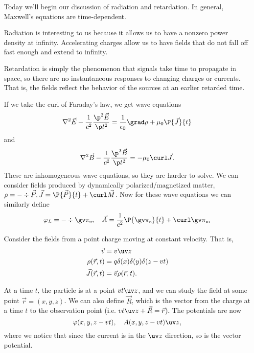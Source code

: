 Today we'll begin our discussion of radiation and retardation. In general, Maxwell's equations are time-dependent.

Radiation is interesting to us because it allows us to have a nonzero power density at infinity. Accelerating charges allow us to have fields that do not fall off fast enough and extend to infinity.

Retardation is simply the phenomenon that signals take time to propagate in space, so there are no instantaneous responses to changing charges or currents. That is, the fields reflect the behavior of the sources at an earlier retarded time.

If we take the curl of Faraday's law, we get wave equations
\begin{equation}
    \nabla^2 \vec E - \frac{1}{c^2} \frac{\p^2 \vec E}{\p t^2} = \frac{1}{\epsilon_0} \grad \rho + \mu_0 \P{\vec J}{t}
\end{equation}
and
\begin{equation}
    \nabla^2 \vec B -\frac{1}{c^2} \frac{\p^2 \vec B}{\p t^2} = -\mu_0 \curl \vec J.
\end{equation}
These are inhomogeneous wave equations, so they are harder to solve. We can consider fields produced by dynamically polarized/magnetized matter, $\rho = -\div \vec P, \vec J = \P{\vec P}{t} + \curl \vec M$. Now for these wave equations we can similarly define
\begin{equation}
    \varphi_L = -\div \gv \pi_\mathrm{e}, \quad \vec A = \frac{1}{c^2} \P{\gv \pi_e}{t} + \curl \gv \pi_\mathrm{m}
\end{equation}%

Consider the fields from a point charge moving at constant velocity. That is,
\begin{align}
    \vec v&= v\uv z\\
    \rho(\vec r,t) &= q \delta(x) \delta(y) \delta(z-vt)\\
    \vec J (\vec r,t) &= \vec v \rho(\vec r,t).
\end{align}

At a time $t$, the particle is at a point $vt \uv z$, and we can study the field at some point $\vec r=(x,y,z)$. We can also define $\vec R$, which is the vector from the charge at a time $t$ to the observation point (i.e. $vt \uv z+\vec R = \vec r$). The potentials are now
\begin{equation}
    \varphi(x,y,z-vt), \quad A(x,y,z-vt) \uv z,
\end{equation}
where we notice that since the current is in the $\uv z$ direction, so is the vector potential.

